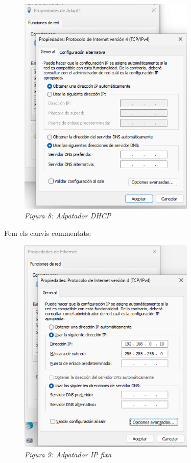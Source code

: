 \documentclass[
  a4paper,
]{article}
\begin{document}
\begin{figure}
\centering
\includegraphics[width=0.75\textwidth,height=\textheight]{png/adaptador.png}
\caption{\emph{Figura 8: Adpatador DHCP}}
\end{figure}

Fem els canvis commentats:

\begin{figure}
\centering
\includegraphics[width=0.75\textwidth,height=\textheight]{png/adaptador1.png}
\caption{\emph{Figura 9: Adpatador IP fixa}}
\end{figure}
\end{document}
